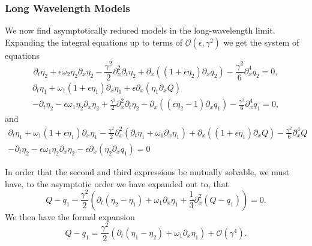 \documentclass[a4paper,11pt]{article}
\newcommand{\p}{\partial}
\begin{document}
\subsubsection*{Long Wavelength Models}
We now find asymptotically reduced models in the long-wavelength limit.  Expanding the integral equations up to terms of $\mathcal{O}(\epsilon,\gamma^{2})$ we get the system of equations 
\[
\p_{t}\eta_{2} + \epsilon\omega_{2}\eta_{2}\p_{x}\eta_{2}- \frac{\gamma^{2}}{2}\p_{x}^{2}\p_{t}\eta_{2} + \p_{x}((1+\epsilon\eta_{2})\p_{x}q_{2}) - \frac{\gamma^{2}}{6}\p_{x}^{4}q_{2} = 0,
\]
\begin{align*}
\p_{t}\eta_{1} + \omega_{1}(1+\epsilon\eta_{1})\p_{x}\eta_{1} + \epsilon\p_{x}(\eta_{1}\p_{x}Q)\\
-\p_{t}\eta_{2}-\epsilon\omega_{1}\eta_{2}\p_{x}\eta_{2}+\frac{\gamma^{2}}{2}\p_{x}^{2}\p_{t}\eta_{2}-\p_{x}((\epsilon\eta_{2}-1)\p_{x}q_{1}) - \frac{\gamma^{2}}{6}\p_{x}^{4}q_{1} = 0,
\end{align*}
and
\begin{align*}
\p_{t}\eta_{1} + \omega_{1}(1+\epsilon\eta_{1})\p_{x}\eta_{1} -\frac{\gamma^{2}}{2}\p_{x}^{2}(\p_{t}\eta_{1} + \omega_{1}\p_{x}\eta_{1})+\p_{x}((1+\epsilon\eta_{1})\p_{x}Q) - \frac{\gamma^{2}}{6}\p^{4}_{x}Q\\
-\p_{t}\eta_{2}-\epsilon\omega_{1}\eta_{2}\p_{x}\eta_{2}-\epsilon\p_{x}(\eta_{2}\p_{x}q_{1}) = 0
\end{align*}

In order that the second and third expressions be mutually solvable, we must have, to the asymptotic order we have expanded out to, that 
\[
Q-q_{1} - \frac{\gamma^{2}}{2}\left( \p_{t}(\eta_{2}-\eta_{1})+\omega_{1}\p_{x}\eta_{1} + \frac{1}{3}\p_{x}^{2}(Q-q_{1}) \right) = 0.
\] 
We then have the formal expansion
\[
Q - q_{1} = \frac{\gamma^{2}}{2}(\p_{t}(\eta_{1}-\eta_{2})+\omega_{1}\p_{x}\eta_{1}) + \mathcal{O}(\gamma^{4}).
\]
\end{document}
